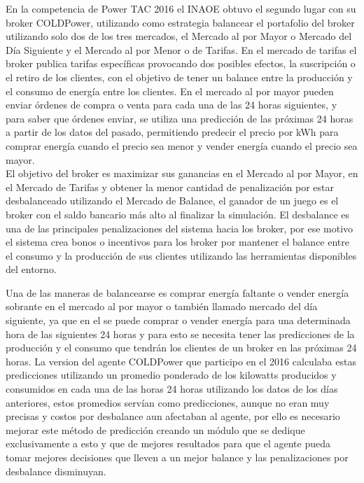 En la competencia de Power TAC 2016 el INAOE obtuvo el segundo lugar con su broker COLDPower, utilizando como estrategia balancear el portafolio del broker utilizando solo dos de los tres mercados, el Mercado al por Mayor o Mercado del Día Siguiente y el Mercado al por Menor o de Tarifas. 
En el mercado de tarifas el broker publica tarifas específicas provocando dos posibles efectos, la suscripción o el retiro de los clientes, con el objetivo de tener un balance entre la producción y el consumo de energía entre los clientes. 
En el mercado al por mayor pueden enviar órdenes de compra o venta para cada una de las 24 horas siguientes, y para saber que órdenes enviar, se utiliza una predicción de las próximas 24 horas a partir de los datos del pasado, permitiendo predecir el precio por kWh para comprar energía cuando el precio sea menor y vender energía cuando el precio sea mayor.
\\
 
El objetivo del broker es maximizar sus ganancias en el  Mercado al por Mayor, en el Mercado de Tarifas y obtener la menor cantidad de penalización por estar desbalanceado utilizando el Mercado de Balance, el ganador de un juego es el broker con el saldo bancario más alto al finalizar la simulación. 
El desbalance es una de las principales penalizaciones del sistema hacia los broker, por ese motivo el sistema crea bonos o incentivos para los broker por mantener el balance entre el consumo y la producción de sus clientes utilizando las herramientas disponibles del entorno.

Una de las maneras de balancearse es comprar energía faltante o vender energía sobrante en el mercado al por mayor o también llamado mercado del día siguiente, ya que en el se puede comprar o vender energía para una determinada hora de las siguientes 24 horas y para esto se necesita tener las predicciones de la producción y el consumo que tendrán los clientes de un broker en las próximas 24 horas.
La version del agente COLDPower que participo en el 2016 calculaba estas predicciones utilizando un promedio ponderado de los kilowatts producidos y consumidos en cada una de las horas 24 horas utilizando los datos de los días anteriores, estos promedios servían como predicciones, aunque no eran muy precisas y costos por desbalance aun afectaban al agente, por ello es necesario mejorar este método de predicción creando un módulo que se dedique exclusivamente a esto y que de mejores resultados para que el agente pueda tomar mejores decisiones que lleven a un mejor balance y las penalizaciones por desbalance disminuyan.

